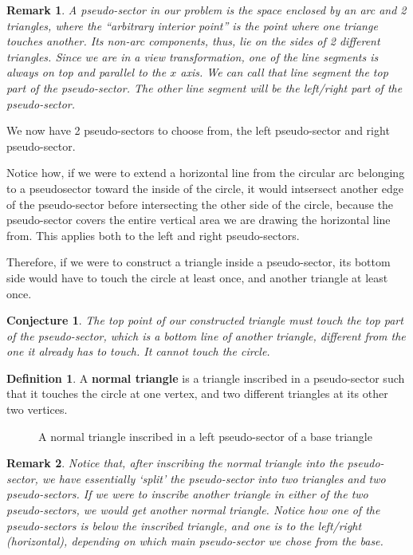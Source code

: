 \documentclass[a4paper,12pt]{article}
\newtheorem*{remark}{Remark}
\newtheorem{conjecture}[theorem]{Conjecture}
\theoremstyle{definition}
\newtheorem{definition}[theorem]{Definition}
\theoremstyle{plain}
\begin{document}
	\begin{remark}
		A pseudo-sector in our problem is the space enclosed by an arc and 2 triangles, where the ``arbitrary interior point'' is the point where one triange touches another.
		Its non-arc components, thus, lie on the sides of 2 different triangles. Since we are in a view transformation, one of the line segments is always on top and parallel to the $x$ axis.
		We can call that line segment the top part of the pseudo-sector. The other line segment will be the left/right part of the pseudo-sector.
	\end{remark}

	We now have 2 pseudo-sectors to choose from, the left pseudo-sector and right pseudo-sector.

	Notice how, if we were to extend a horizontal line from the circular arc belonging to a pseudosector toward the
	inside of the circle, it would intsersect another edge of the pseudo-sector before intersecting
	the other side of the circle, because the pseudo-sector covers the entire vertical area we are drawing the horizontal line from.
	This applies both to the left and right pseudo-sectors.

	Therefore, if we were to construct a triangle inside a pseudo-sector, its bottom side would have to touch the circle at least once, and another triangle at least once.

	\begin{conjecture}
		The top point of our constructed triangle must touch the top part of the pseudo-sector, which is a bottom line of another triangle, different from the one it already has to touch.
		It cannot touch the circle.
	\end{conjecture}

	\begin{definition}
		A \textbf{normal triangle} is a triangle inscribed in a pseudo-sector such that it touches the circle at one vertex, and two different triangles at its other two vertices.
	\end{definition}
	
	\begin{figure}[h]
		\centering
		\def\svgwidth{\columnwidth}
		\scalebox{0.65}{}
		\caption{A normal triangle inscribed in a left pseudo-sector of a base triangle}
	\end{figure}
	
	\begin{remark}
		Notice that, after inscribing the normal triangle into the pseudo-sector, we have essentially `split' the pseudo-sector into two triangles and two pseudo-sectors.
		If we were to inscribe another triangle in either of the two pseudo-sectors, we would get another normal triangle.
		Notice how one of the pseudo-sectors is below the inscribed triangle, and one is to the left/right (horizontal), depending on which main pseudo-sector we chose from the base.
	\end{remark}
\end{document}
